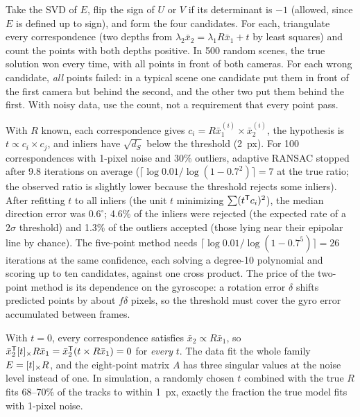 \begin{solutions}
  \item Take the SVD of $E$, flip the sign of $U$ or $V$ if its determinant is $-1$ (allowed, since $E$ is defined up to sign), and form the four candidates. For each,
        triangulate every correspondence (two depths from $\lambda_2\bar x_2 = \lambda_1R\bar x_1 + t$ by least squares) and count the points with both depths positive. In 500 random
        scenes, the true solution won every time, with all points in front of both cameras. For each wrong candidate, \emph{all} points failed: in a typical scene one
        candidate put them in front of the first camera but behind the second, and the other two put them behind the first. With noisy data, use the count, not
        a requirement that every point pass.

  \item With $R$ known, each correspondence gives $c_i = R\bar x_1^{(i)}\times\bar x_2^{(i)}$, the hypothesis is $t \propto c_i\times c_j$, and inliers have $\sqrt{d_S}$ below the threshold (2~px).
        For 100 correspondences with 1-pixel noise and 30\% outliers, adaptive RANSAC stopped after 9.8 iterations on average ($\lceil\log0.01/\log(1 - 0.7^2)\rceil = 7$
        at the true ratio; the observed ratio is slightly lower because the threshold rejects some inliers). After refitting $t$ to all inliers (the unit $t$
        minimizing $\sum(t^{\mathsf{T}} c_i)^2$), the median direction error was $0.6^\circ$; 4.6\% of the inliers were rejected (the expected rate of a $2\sigma$ threshold) and 1.3\% of the
        outliers accepted (those lying near their epipolar line by chance). The five-point method needs $\lceil\log0.01/\log(1 - 0.7^5)\rceil = 26$ iterations at the same confidence,
        each solving a degree-10 polynomial and scoring up to ten candidates, against one cross product. The price of the two-point method is its dependence
        on the gyroscope: a rotation error $\delta$ shifts predicted points by about $f\delta$ pixels, so the threshold must cover the gyro error accumulated between
        frames.

  \item With $t = 0$, every correspondence satisfies $\bar x_2 \propto R\bar x_1$, so $\bar x_2^{\mathsf{T}}[t]_{\times}R\bar x_1 = \bar x_2^{\mathsf{T}}(t\times R\bar x_1) = 0$ for \emph{every} $t$. The data fit the
        whole family $E = [t]_{\times}R$, and the eight-point matrix $A$ has three singular values at the noise level instead of one. In simulation, a randomly chosen
        $t$ combined with the true $R$ fits 68--70\% of the tracks to within 1~px, exactly the fraction the true model fits with 1-pixel noise.


\end{solutions}
